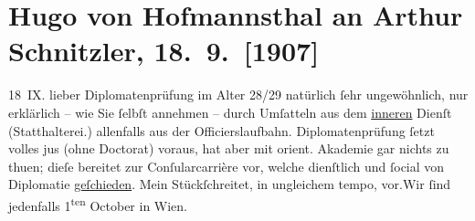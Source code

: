 

         
         \renewcommand{\erwaehntePersonen}{Personen: Jakob Wassermann}
         \renewcommand{\erwaehnteInstitutionen}{Institutionen: Morgen. Wochenschrift für deutsche Kultur, Orientalische Akademie, Über Land und Meer}
         \renewcommand{\erwaehnteOrte}{Orte: Bad Aussee, Wien}
         \renewcommand{\erwaehnteWerke}{Werke: Caspar Hauser oder Die Trägheit des Herzens, Silvia im »Stern«}
               \section[Hugo von Hofmannsthal an Arthur Schnitzler, 18. 9. {[}1907{]}]{ Hugo von Hofmannsthal an Arthur Schnitzler, 18. 9. {[}1907{]}}\nopagebreak{}\rehead{ }\begin{ledgroupsized}[t]{13cm}\normalsize\beginnumbering \toendnotes[C]{\smallbreak\pagebreak[2]} 
\toendnotes[C]{\smallbreak}\pstart
           \raggedleft{}18 IX.\pend
           \pstart{}{\pb}lieber\pend\pstart
           Diplomatenprüfung im Alter 28/29 natürlich ſehr ungewöhnlich, nur erklärlich – wie
               Sie ſelbſt annehmen – durch Umſatteln aus dem \uline{inneren}
               Dienſt (Statthalterei.) allenfalls aus der Officierslaufbahn. Diplomatenprüfung ſetzt
               volles jus (ohne Doctorat) voraus, hat aber mit orient.
                  Akademie gar nichts zu thuen; dieſe bereitet zur Conſularcarrière {\pb}vor, welche dienſtlich und ſocial
               von Diplomatie \uline{geſchieden}.\pend
           \pstart
           Mein Stückſchreitet, in ungleichem tempo, vor.\hspace*{1.5em}Wir ſind jedenfalls 1\textsuperscript{ten} October in Wien.\pend

\end{ledgroupsized}
